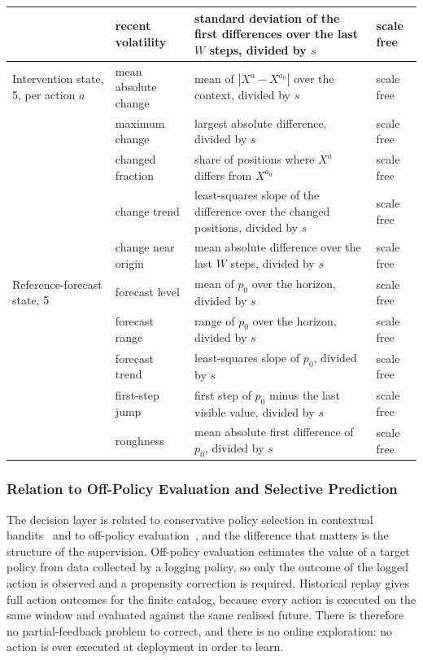 \documentclass{article}
\begin{document}
\begin{table}[htbp]
{\begin{tabular}{@{}l p{} p{} p{}@{}}
     & recent volatility & standard deviation of the first differences over the last $W$ steps, divided by $s$ & scale free \\
    \midrule
    Intervention state, 5, per action $a$ & mean absolute change & mean of $|X^{a} - X^{a_0}|$ over the context, divided by $s$ & scale free \\
     & maximum change & largest absolute difference, divided by $s$ & scale free \\
     & changed fraction & share of positions where $X^{a}$ differs from $X^{a_0}$ & scale free \\
     & change trend & least-squares slope of the difference over the changed positions, divided by $s$ & scale free \\
     & change near origin & mean absolute difference over the last $W$ steps, divided by $s$ & scale free \\
    \midrule
    Reference-forecast state, 5 & forecast level & mean of $p_0$ over the horizon, divided by $s$ & scale free \\
     & forecast range & range of $p_0$ over the horizon, divided by $s$ & scale free \\
     & forecast trend & least-squares slope of $p_0$, divided by $s$ & scale free \\
     & first-step jump & first step of $p_0$ minus the last visible value, divided by $s$ & scale free \\
     & roughness & mean absolute first difference of $p_0$, divided by $s$ & scale free \\
    \bottomrule
  \end{tabular}}
\end{table}

\subsubsection{Relation to Off-Policy Evaluation and Selective Prediction}
\label{app:ope-positioning}
The decision layer is related to conservative policy selection in contextual
bandits~\citep{abbasiyadkori2011improved,lattimore2020bandit} and to off-policy
evaluation~\citep{strehl2010learning,dudik2011doubly,swaminathan2015counterfactual,
jiang2016doubly,thomas2016data}, and the difference that matters is the structure of the
supervision. Off-policy evaluation estimates the value of a target policy from data collected
by a logging policy, so only the outcome of the logged action is observed and a propensity
correction is required. Historical replay gives full action outcomes for the finite catalog,
because every action is executed on the same window and evaluated against the same realised
future. There is therefore no partial-feedback problem to correct, and there is no online
exploration: no action is ever executed at deployment in order to learn.
\end{document}
